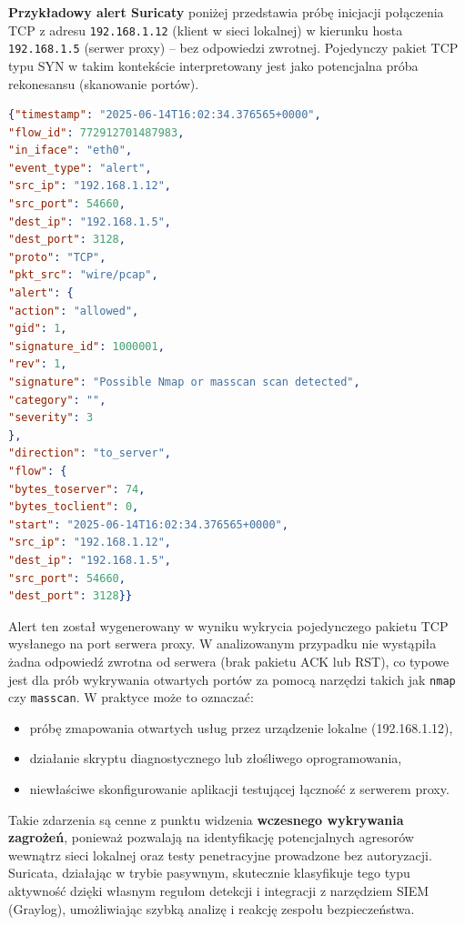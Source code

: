 \documentclass[
    left=2.5cm,         %
    right=2.5cm,        %
    top=2.5cm,          %
    bottom=3cm,         %
    bindingoffset=6mm,  %
    nohyphenation=true %
]{eiti/eiti-thesis} %
\begin{document}
\textbf{Przykładowy alert Suricaty} poniżej przedstawia próbę inicjacji połączenia TCP z adresu \texttt{192.168.1.12} (klient w sieci lokalnej) w kierunku hosta \texttt{192.168.1.5} (serwer proxy) – bez odpowiedzi zwrotnej. Pojedynczy pakiet TCP typu SYN w takim kontekście interpretowany jest jako potencjalna próba rekonesansu (skanowanie portów).

\begin{lstlisting}[language=json, caption={Alert Suricaty typu \texttt{Possible Nmap or masscan scan detected} na porcie \texttt{3128/TCP}}, label={lst:suricata-proxy-alert}]
{"timestamp": "2025-06-14T16:02:34.376565+0000",
"flow_id": 772912701487983,
"in_iface": "eth0",
"event_type": "alert",
"src_ip": "192.168.1.12",
"src_port": 54660,
"dest_ip": "192.168.1.5",
"dest_port": 3128,
"proto": "TCP",
"pkt_src": "wire/pcap",
"alert": {
"action": "allowed",
"gid": 1,
"signature_id": 1000001,
"rev": 1,
"signature": "Possible Nmap or masscan scan detected",
"category": "",
"severity": 3
},
"direction": "to_server",
"flow": {
"bytes_toserver": 74,
"bytes_toclient": 0,
"start": "2025-06-14T16:02:34.376565+0000",
"src_ip": "192.168.1.12",
"dest_ip": "192.168.1.5",
"src_port": 54660,
"dest_port": 3128}}
\end{lstlisting}

Alert ten został wygenerowany w wyniku wykrycia pojedynczego pakietu TCP wysłanego na port serwera proxy. W analizowanym przypadku nie wystąpiła żadna odpowiedź zwrotna od serwera (brak pakietu ACK lub RST), co typowe jest dla prób wykrywania otwartych portów za pomocą narzędzi takich jak \texttt{nmap} czy \texttt{masscan}. W praktyce może to oznaczać:
\begin{itemize}
\item próbę zmapowania otwartych usług przez urządzenie lokalne (192.168.1.12),
\item działanie skryptu diagnostycznego lub złośliwego oprogramowania,
\item niewłaściwe skonfigurowanie aplikacji testującej łączność z serwerem proxy.
\end{itemize}

Takie zdarzenia są cenne z punktu widzenia \textbf{wczesnego wykrywania zagrożeń}, ponieważ pozwalają na identyfikację potencjalnych agresorów wewnątrz sieci lokalnej oraz testy penetracyjne prowadzone bez autoryzacji. Suricata, działając w trybie pasywnym, skutecznie klasyfikuje tego typu aktywność dzięki własnym regułom detekcji i integracji z narzędziem SIEM (Graylog), umożliwiając szybką analizę i reakcję zespołu bezpieczeństwa.
\end{document}
